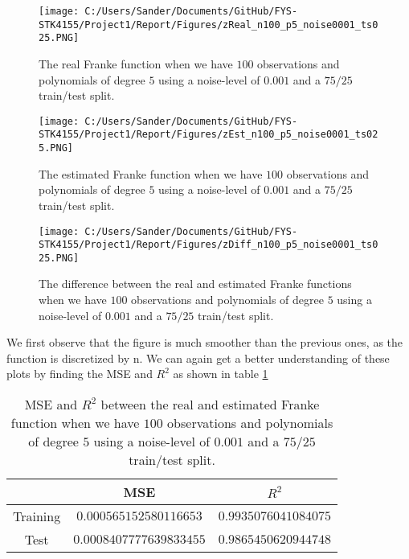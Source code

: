 \documentclass[12pt,a4paper]{article}
\begin{document}
\begin{figure}[H]
\centering
\texttt{[image: C:/Users/Sander/Documents/GitHub/FYS-STK4155/Project1/Report/Figures/zReal\_n100\_p5\_noise0001\_ts025.PNG]}
\caption{\label{fig:FrankeReal2} The real Franke function when we have $100$ observations and polynomials of degree $5$ using a noise-level of $0.001$ and a $75/25$ train/test split.}
\end{figure}

\begin{figure}[H]
\centering
\texttt{[image: C:/Users/Sander/Documents/GitHub/FYS-STK4155/Project1/Report/Figures/zEst\_n100\_p5\_noise0001\_ts025.PNG]}
\caption{\label{fig:FrankeEst2} The estimated Franke function when we have $100$ observations and polynomials of degree $5$ using a noise-level of $0.001$ and a $75/25$ train/test split.}
\end{figure}

\begin{figure}[H]
\centering
\texttt{[image: C:/Users/Sander/Documents/GitHub/FYS-STK4155/Project1/Report/Figures/zDiff\_n100\_p5\_noise0001\_ts025.PNG]}
\caption{\label{fig:FrankeDIFF2} The difference between the real and estimated Franke functions when we have $100$ observations and polynomials of degree $5$ using a noise-level of $0.001$ and a $75/25$ train/test split.}
\end{figure}

\noindent We first observe that the figure is much smoother than the previous ones, as the function is discretized by n. We can again get a better understanding of these plots by finding the MSE and $R^2$ as shown in table \ref{tab:ESTREAL2}

\begin{table}[h]
\caption{\label{tab:ESTREAL2} MSE and $R^2$ between the real and estimated Franke function when we have $100$ observations and polynomials of degree $5$ using a noise-level of $0.001$ and a $75/25$ train/test split.}
\centering
\begin{tabular}{c|c|c}
 & MSE & $R^2$\\
\hline
Training & $0.000565152580116653$ & $0.9935076041084075$\\
\hline
Test & $0.0008407777639833455$ & $0.9865450620944748$\\	  
\end{tabular}
\end{table}
\end{document}
